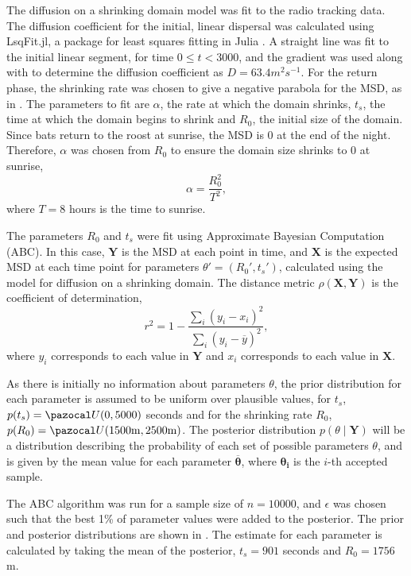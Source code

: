 The diffusion on a shrinking domain model was fit to the radio tracking data. The diffusion coefficient for the initial, linear dispersal was calculated using
LsqFit.jl, a package for least squares fitting in Julia \cite{LsqFit}. A
straight line was fit to the initial linear segment, for time $0 \leq t < 3000$, and the gradient was used
along with  to determine the diffusion coefficient as $D
= 63.4 m^2s^{-1}$. For the return phase, the shrinking rate was chosen to give a negative parabola for the MSD, as in . The parameters to fit are $\alpha$, the rate at which the domain shrinks,
$t_s$, the time at which the domain begins to shrink and $R_0$, the initial size
of the domain. Since bats return to the roost at sunrise, the MSD is 0 at the end of the night. Therefore, $\alpha$ was chosen from $R_0$ to ensure the domain size shrinks to 0 at sunrise,
%
\begin{equation}
\alpha = \frac{R_0^2}{T^2},
\end{equation}
%
where $T = 8 $ hours is the time to sunrise.

 The parameters $R_0$ and $t_s$ were fit using Approximate Bayesian Computation (ABC). In this case, $\bm{Y}$ is the MSD at each point in time, and $\bm{X}$ is the expected MSD at each time
point for parameters $\theta' = (R_0',t_s') $, calculated using the model for
diffusion on a shrinking domain. The distance metric $\rho(\bm{X},\bm{Y})$ is the coefficient of determination,
%
\begin{equation}
r^2 = 1 - \frac{\sum_i(y_i - x_i)^2 }{\sum_i (y_i - \overline{y})^2},
\end{equation}
%
where $y_i$ corresponds to each value in $\bm{Y}$ and $x_i$ corresponds to each value in $\bm{X}$.

As there is initially no information about parameters $\theta$, the prior distribution for each parameter is assumed to be uniform over plausible values, for $t_s$, $p(t_s) = \unif(0,5000)$ seconds and for the shrinking rate $R_0$, $p(R_0) = \unif(1500\mathrm{m},2500\mathrm{m})$. The posterior distribution $ p(\theta \mid \bm{Y})$ will be a distribution describing the probability of each set of possible parameters $\theta$, and is given by the mean value for each parameter $\overline{\bm{\theta}}$, where $\bm{\theta_i}$ is the $i$-th accepted sample.

The ABC algorithm was run for a sample size of $n = 10000$, and $\epsilon$ was chosen such that the best 1\% of parameter values were added to the posterior. The prior and posterior distributions are shown in . The estimate for each parameter is calculated by taking the mean of the posterior, $t_s = 901$ seconds and $R_0 = 1756$m.


